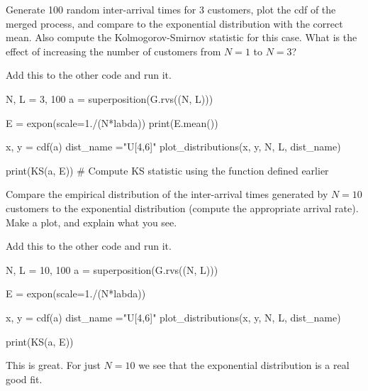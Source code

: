 \begin{exercise}
  Generate 100 random inter-arrival times for 3 customers, plot the cdf of the merged process, and compare to the exponential distribution with the correct mean. Also compute the Kolmogorov-Smirnov statistic for this case. What is the effect of increasing the number of customers from $N=1$ to $N=3$?
\begin{solution}
Add this to the other code and run it. 
\begin{pyverbatim}
N, L = 3, 100
a = superposition(G.rvs((N, L)))

E = expon(scale=1./(N*labda))
print(E.mean())

x, y = cdf(a)
dist_name ="U[4,6]"
plot_distributions(x, y, N, L, dist_name)

print(KS(a, E)) # Compute KS statistic using the function defined earlier
\end{pyverbatim}

\end{solution}
\end{exercise}


\begin{exercise}
  Compare  the empirical distribution of the inter-arrival times generated by  $N=10$ customers to the exponential distribution (compute the appropriate arrival rate). Make a plot, and explain what you see.
\begin{solution}
Add this to the other code and run it. 
\begin{pyverbatim}
N, L = 10, 100
a = superposition(G.rvs((N, L)))

E = expon(scale=1./(N*labda))

x, y = cdf(a)
dist_name ="U[4,6]"
plot_distributions(x, y, N, L, dist_name)

print(KS(a, E)) 
\end{pyverbatim}

This is great. For just $N=10$ we see that the exponential distribution is a real good fit. 
\end{solution}
\end{exercise}



